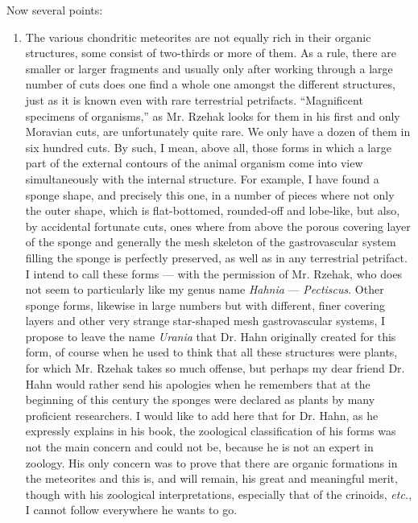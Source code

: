 \documentclass[a4paper, 12pt, oneside]{article}
\begin{document}
Now several points:
\begin{enumerate}
\item The various chondritic meteorites are not equally rich in their organic structures, some consist of two-thirds or more of them. As a rule, there are smaller or larger fragments and usually only after working through a large number of cuts does one find a whole one amongst the different structures, just as it is known even with rare terrestrial petrifacts. ``Magnificent specimens of organisms,'' as Mr. Rzehak looks for them in his first and only Moravian cuts, are unfortunately quite rare. We only have a dozen of them in six hundred cuts. By such, I mean, above all, those forms in which a large part of the external contours of the animal organism come into view simultaneously with the internal structure. For example, I have found a sponge shape, and precisely this one, in a number of pieces where not only the outer shape, which is flat-bottomed, rounded-off and lobe-like, but also, by accidental fortunate cuts, ones where from above the porous covering layer of the sponge and generally the mesh skeleton of the gastrovascular system filling the sponge is perfectly preserved, as well as in any terrestrial petrifact. I intend to call these forms --- with the permission of Mr. Rzehak, who does not seem to particularly like my genus name \emph{Hahnia} --- \emph{Pectiscus}. Other sponge forms, likewise in large numbers but with different, finer covering layers and other very strange star-shaped mesh gastrovascular systems, I propose to leave the name \emph{Urania} that Dr. Hahn originally created for this form, of course when he used to think that all these structures were plants, for which Mr. Rzehak takes so much offense, but perhaps my dear friend Dr. Hahn would rather send his apologies when he remembers that at the beginning of this century the sponges were declared as plants by many proficient researchers. I would like to add here that for Dr. Hahn, as he expressly explains in his book, the zoological classification of his forms was not the main concern and could not be, because he is not an expert in zoology. His only concern was to prove that there are organic formations in the meteorites and this is, and will remain, his great and meaningful merit, though with his zoological interpretations, especially that of the crinoids, \emph{etc.}, I cannot follow everywhere he wants to go.

\end{enumerate}
\end{document}
